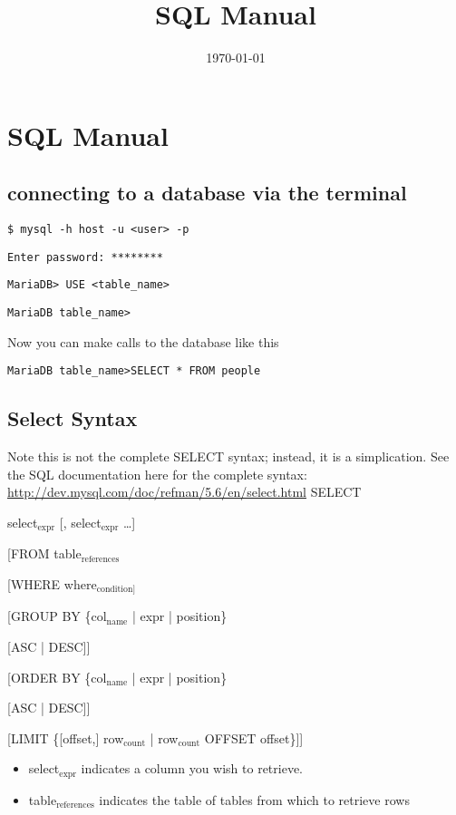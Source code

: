 \documentclass[11pt]{article}
\date{\today}
\title{SQL Manual}
\begin{document}
\maketitle
\setcounter{tocdepth}{2}
\tableofcontents


\section{SQL Manual}
\label{sec-1}
\subsection{connecting to a database via the terminal}
\label{sec-1-1}
\verb~$ mysql -h host -u <user> -p~

\verb~Enter password: ********~

\verb~MariaDB> USE <table_name>~

\verb~MariaDB table_name>~


Now you can make calls to the database like this


\verb~MariaDB table_name>SELECT * FROM people~
\subsection{Select Syntax}
\label{sec-1-2}
Note this is not the complete SELECT syntax; instead, it is a simplication. See the SQL documentation here for the complete
syntax: \url{http://dev.mysql.com/doc/refman/5.6/en/select.html}
SELECT

select$_{\text{expr}}$ [, select$_{\text{expr}}$ \ldots{}]

[FROM table$_{\text{references}}$

[WHERE where$_{\text{condition]}}$

[GROUP BY \{col$_{\text{name}}$ | expr | position\}

[ASC | DESC]]

[ORDER BY \{col$_{\text{name}}$ | expr | position\}

[ASC | DESC]]

[LIMIT \{[offset,] row$_{\text{count}}$ | row$_{\text{count}}$ OFFSET offset\}]]

\begin{itemize}
\item select$_{\text{expr}}$ indicates a column you wish to retrieve.

\item table$_{\text{references}}$ indicates the table of tables from which to retrieve rows
\end{itemize}
\end{document}
